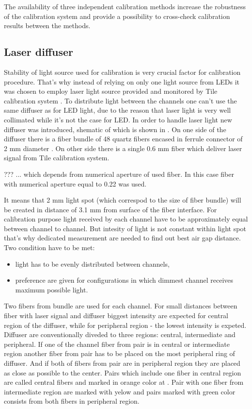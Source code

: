 The availability of three independent calibration methods increase the robustness of the calibration system 
and provide a possibility to cross-check calibration results between the methods.

\subsection{Laser diffuser}
\label{subsec:laserDiffuser}


Stability of light source used for calibration is very crucial factor for calibration procedure.
That's why instead of relying on only one light source from LEDs it was chosen to employ laser light source 
provided and monitored by Tile calibration system \cite{atlasGeneral}. 
To distribute light between the channels one can't use the same diffuser as for LED light, 
due to the reason that laser light is very well collimated while it's not the case for LED.
In order to handle laser light new diffuser was introduced, shematic of which is shown in .
On one side of the diffuser there is a fiber bundle of 48 quartz fibers encased in ferrule connector of 2 mm diameter .
On other side there is a single 0.6 mm fiber which deliver laser signal from Tile calibration system.

??? ... which depends from numerical aperture of used fiber. In this case fiber with numerical aperture equal to 0.22 was used.

It means that 2 mm light spot (which correspod to the size of fiber bundle) will be created in distance of 3.1 mm from surface of the fiber interface.
For calibration purpose light received by each channel have to be approximately equal between channel to channel. But intesity of light is not constant within light spot
that's why dedicated measurement are needed to find out best air gap distance.
Two condition have to be met:
\begin{itemize}
 \item light has to be evenly distributed between channels,
 \item preference are given for configurations in which dimmest channel receives maximum possible light.
\end{itemize}
Two fibers from bundle are used for each channel. For small distances between fiber with laser signal and diffuser biggest intensity are expected for central region of the diffuser, 
while for peripheral region - the lowest intensity is expeted. 
Diffuser are conventionally diveded to three regions: central, intermediate and peripheral. 
If one of the channel fiber from pair is in central or intermediate region another fiber from pair has to be placed on the most peripheral ring of diffuser.
And if both of fibers from pair are in peripheral region they are placed as close as possible to the center.
Pairs which include one fiber in central region are called central fibers and marked in orange color at .
Pair with one fiber from intermediate region are marked with yelow and pairs marked with green color consists from both fibers in peripheral region.

